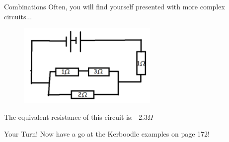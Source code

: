 \documentclass[../Main.tex]{subfiles}
\begin{document}
\begin{frame}{Combinations}
    Often, you will find yourself presented with more complex circuits...
    
    \begin{figure}
        \centering
        \includegraphics[height=4cm]{Electricity_Images/complex_circuit.jpg}
    \end{figure}

    The equivalent resistance of this circuit is: \pause 
    --2.3$\Omega$

    \begin{exampleblock}{Your Turn!}
        Now have a go at the Kerboodle examples on page 172!
    \end{exampleblock}
\end{frame}
\end{document}
